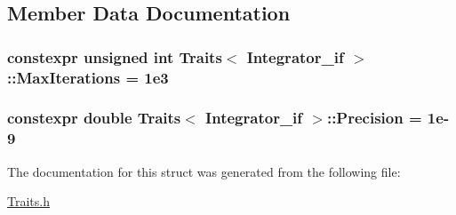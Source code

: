 \subsection{Member Data Documentation}
\subsubsection[{\texorpdfstring{Max\+Iterations}{MaxIterations}}]{\setlength{\rightskip}{0pt plus 5cm}constexpr unsigned int {\bf Traits}$<$ {\bf Integrator\+\_\+if} $>$\+::Max\+Iterations = 1e3\hspace{0.3cm}{\ttfamily [static]}}\hypertarget{struct_traits_3_01_integrator__if_01_4_af5798506f92f1950cc878585b47b1b3d}{}\label{struct_traits_3_01_integrator__if_01_4_af5798506f92f1950cc878585b47b1b3d}
\subsubsection[{\texorpdfstring{Precision}{Precision}}]{\setlength{\rightskip}{0pt plus 5cm}constexpr double {\bf Traits}$<$ {\bf Integrator\+\_\+if} $>$\+::Precision = 1e-\/9\hspace{0.3cm}{\ttfamily [static]}}\hypertarget{struct_traits_3_01_integrator__if_01_4_a040fd02afb3cf89c999fd7affeefa70f}{}\label{struct_traits_3_01_integrator__if_01_4_a040fd02afb3cf89c999fd7affeefa70f}


The documentation for this struct was generated from the following file\+:\begin{DoxyCompactItemize}
\item 
\hyperlink{_traits_8h}{Traits.\+h}\end{DoxyCompactItemize}
